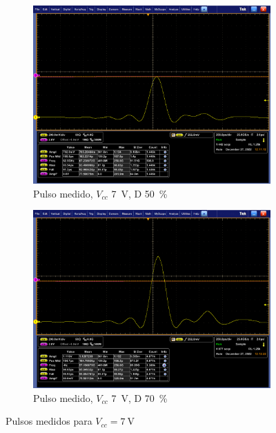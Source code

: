 \begin{figure}[t!]
    \centering
    \begin{subfigure}[b]{0.49\textwidth}
        \centering
        \includegraphics[width=\textwidth]{images/mediciones/vcc_7v_duty_50.png}
        \caption{Pulso medido, $V_{cc}$ \qty{7}{\volt}, D \qty{50}{\percent} }
        \label{fig:mediciones_7v_50}
    \end{subfigure}
    \hfill
    \begin{subfigure}[b]{0.49\textwidth}
        \centering
        \includegraphics[width=\textwidth]{images/mediciones/vcc_7v_duty_70.png}
        \caption{Pulso medido, $V_{cc}$ \qty{7}{\volt}, D \qty{70}{\percent} }
        \label{fig:mediciones_7v_70}
    \end{subfigure}
    \caption{Pulsos medidos para $V_{cc} = \qty{7}{\volt}$}
    \label{fig:mediciones_7v}
\end{figure}

